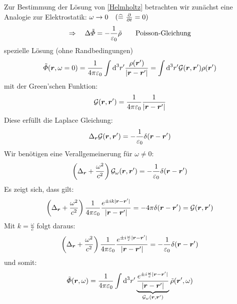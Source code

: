 \noindent
Zur Bestimmung der Lösung von \eqref{Helmholtz} betrachten wir zunächst eine Analogie zur Elektrostatik: $ \omega \to 0 \quad (\widehat{=} \ \frac{\partial }{\partial t} = 0) $
\begin{equation*}
\Rightarrow \quad \Delta \tilde{\varPhi} = - \frac{1}{\varepsilon_0} \tilde{\rho} \qquad \textrm{Poisson-Gleichung}
\end{equation*}
spezielle Lösung (ohne Randbedingungen)
\begin{equation*}
\tilde{\varPhi} (\bm{r},\omega = 0) = \frac{1}{4\pi\varepsilon_0} \int \textrm{d}^3 r' \frac{\rho(\bm{r}')}{| \bm{r} - \bm{r}' |} = \int \textrm{d}^3 r' \mathcal G(\bm{r},\bm{r}') \rho(\bm{r}')
\end{equation*}
mit der Green'schen Funktion:
\begin{equation*}
\mathcal G(\bm{r},\bm{r}') = \frac{1}{4\pi\varepsilon_0} \frac{1}{| \bm{r} - \bm{r}' |}
\end{equation*}
Diese erfüllt die Laplace Gleichung:
\begin{equation*}
\Delta_{\bm{r}} \mathcal G(\bm{r},\bm{r}') = - \frac{1}{\varepsilon_0} \delta(\bm{r} - \bm{r}')
\end{equation*}
Wir benötigen eine Verallgemeinerung für $ \omega \neq 0 $:
\begin{equation*}
\left(\Delta_{\bm{r}} + \frac{\omega^2}{c^2}\right) \mathcal{G}_{\omega} (\bm{r}, \bm{r}') = - \frac{1}{\varepsilon_0} \delta(\bm{r} - \bm{r}')
\end{equation*}
Es zeigt sich, dass gilt:
\begin{equation*}
\left(\Delta_{\bm{r}} + \frac{\omega^2}{c^2}\right) \frac{1}{4\pi\varepsilon_0} \frac{e^{\pm i k |\bm{r} - \bm{r}'|}}{|\bm{r} - \bm{r}'|} = - 4 \pi \delta(\bm{r} - \bm{r}') = \mathcal G(\bm{r},\bm{r}')
\end{equation*}
%
%
%
%
%
%
Mit $ k = \frac{\omega}{c} $ folgt daraus:
\begin{equation*}
\left(\Delta_{\bm{r}} + \frac{\omega^2}{c^2}\right) \frac{1}{4\pi\varepsilon_0} \frac{e^{\pm i \frac{\omega}{c} |\bm{r} - \bm{r}'|}}{|\bm{r} - \bm{r}'|} = - \frac{1}{\varepsilon_0} \delta(\bm{r} - \bm{r}')
\end{equation*}
und somit:
\begin{equation*}
\tilde{\varPhi} (\bm{r},\omega) = \frac{1}{4\pi\varepsilon_0} \int \textrm{d}^3 r' \underbrace{\frac{e^{\pm i \frac{\omega}{c} |\bm{r} - \bm{r}'|}}{|\bm{r} - \bm{r}'|}}_{\mathcal{G}_{\omega} (\bm{r},\bm{r}')} \tilde{\rho}(\bm{r}',\omega)
\end{equation*}
\\[5pt]
